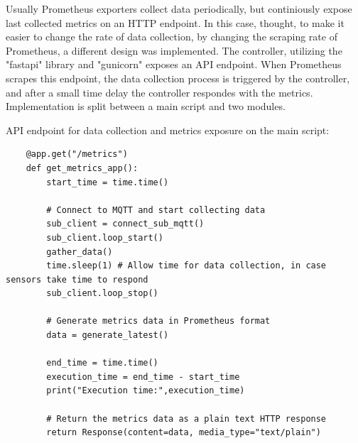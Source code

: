 Usually Prometheus exporters collect data periodically, but continiously expose last collected metrics on an HTTP endpoint. In this case, thought, to make it easier to change the rate of data collection, by changing the scraping rate of Prometheus, a different design was implemented. The controller, utilizing the "fastapi" library and "gunicorn" exposes an API endpoint. When Prometheus scrapes this endpoint, the data collection process is triggered by the controller, and after a small time delay the controller respondes with the metrics. Implementation is split between a main script and two modules.

API endpoint for data collection and metrics exposure on the main script:
\begin{verbatim}
    @app.get("/metrics")
    def get_metrics_app():
        start_time = time.time()
        
        # Connect to MQTT and start collecting data
        sub_client = connect_sub_mqtt()
        sub_client.loop_start()
        gather_data()
        time.sleep(1) # Allow time for data collection, in case sensors take time to respond
        sub_client.loop_stop()

        # Generate metrics data in Prometheus format
        data = generate_latest()

        end_time = time.time()
        execution_time = end_time - start_time
        print("Execution time:",execution_time)

        # Return the metrics data as a plain text HTTP response
        return Response(content=data, media_type="text/plain")
\end{verbatim}


